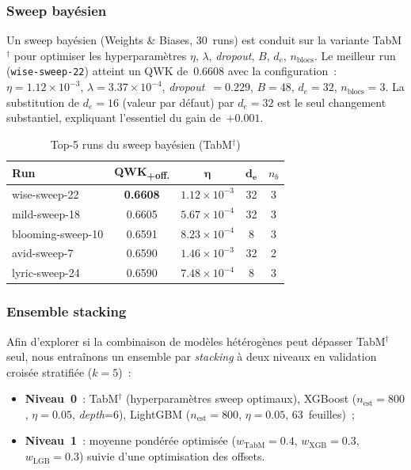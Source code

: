 \documentclass[conference]{IEEEtran}
\begin{document}
\subsubsection{Sweep bayésien}

Un sweep bayésien (Weights \& Biases, 30~runs) est conduit sur la variante
TabM$^\dagger$ pour optimiser les hyperparamètres
$\eta$, $\lambda$, \textit{dropout}, $B$, $d_e$, $n_{\text{blocs}}$.
Le meilleur run (\texttt{wise-sweep-22}) atteint un QWK de~$\mathbf{0.6608}$
avec la configuration~: $\eta=1.12\times10^{-3}$, $\lambda=3.37\times10^{-4}$,
\textit{dropout}~$=0.229$, $B=48$, $d_e=32$, $n_{\text{blocs}}=3$.
La substitution de $d_e=16$ (valeur par défaut) par $d_e=32$ est le seul
changement substantiel, expliquant l'essentiel du gain de~$+0.001$.

\begin{table}[htbp]
\caption{Top-5 runs du sweep bayésien (TabM$^\dagger$)}
\label{tab:sweep}
\centering
\begin{tabular}{lcccc}
\toprule
\textbf{Run} & \textbf{QWK\textsubscript{+off.}} & $\boldsymbol{\eta}$ &
$\boldsymbol{d_e}$ & $n_b$ \\
\midrule
wise-sweep-22    & \textbf{0.6608} & $1.12\times10^{-3}$ & 32 & 3 \\
mild-sweep-18    & 0.6605 & $5.67\times10^{-4}$ & 32 & 3 \\
blooming-sweep-10 & 0.6591 & $8.23\times10^{-4}$ & 8  & 3 \\
avid-sweep-7     & 0.6590 & $1.46\times10^{-3}$ & 32 & 2 \\
lyric-sweep-24   & 0.6590 & $7.48\times10^{-4}$ & 8  & 3 \\
\bottomrule
\end{tabular}
\end{table}

\subsubsection{Ensemble stacking}

Afin d'explorer si la combinaison de modèles hétérogènes peut dépasser
TabM$^\dagger$ seul, nous entraînons un ensemble par \textit{stacking}
à deux niveaux en validation croisée stratifiée ($k=5$)~:
\begin{itemize}
  \item \textbf{Niveau~0}~: TabM$^\dagger$ (hyperparamètres sweep optimaux),
        XGBoost ($n_\text{est}=800$, $\eta=0.05$, \textit{depth}=6),
        LightGBM ($n_\text{est}=800$, $\eta=0.05$, 63~feuilles)~;
  \item \textbf{Niveau~1}~: moyenne pondérée optimisée ($w_{\text{TabM}}=0.4$,
        $w_{\text{XGB}}=0.3$, $w_{\text{LGB}}=0.3$) suivie d'une optimisation
        des offsets.
\end{itemize}
\end{document}
